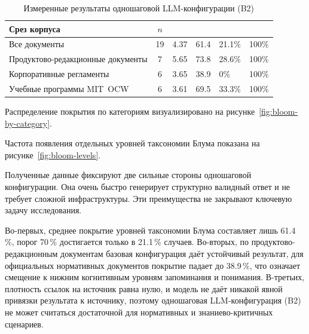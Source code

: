 \begin{table}[H]
  \caption{Измеренные результаты одношаговой LLM-конфигурации (B2)}
  \label{tab:b2prelim}
  \centering
  {\scriptsize
  \setlength{\tabcolsep}{2pt}
  \renewcommand{\arraystretch}{1.15}
  \begin{tabular}{|P{3.65cm}|c|P{1.85cm}|P{2.05cm}|P{2.35cm}|P{2.65cm}|}
  \hline
  \textbf{Срез корпуса}
    & \textbf{$n$}
    & 
    & 
    & 
    &  \\
  \hline
  Все документы
    & 19
    & 4.37
    & 61.4
    & 21.1\%
    & 100\% \\
  \hline
  Продуктово-редакционные документы
    & 7
    & 5.65
    & 73.8
    & 28.6\%
    & 100\% \\
  \hline
  Корпоративные регламенты
    & 6
    & 3.65
    & 38.9
    & 0\%
    & 100\% \\
  \hline
  Учебные программы MIT~OCW
    & 6
    & 3.61
    & 69.5
    & 33.3\%
    & 100\% \\
  \hline
  \end{tabular}
  }
\end{table}

Распределение покрытия по категориям визуализировано на рисунке~\ref{fig:bloom-by-category}.



Частота появления отдельных уровней таксономии Блума показана на рисунке~\ref{fig:bloom-levels}.



Полученные данные фиксируют две сильные стороны одношаговой
конфигурации. Она очень быстро генерирует структурно валидный
ответ и не требует сложной инфраструктуры. Эти преимущества
не закрывают ключевую задачу исследования.

Во-первых, среднее покрытие уровней таксономии Блума составляет лишь 61.4\,\%,
порог 70\,\% достигается только в 21.1\,\% случаев. Во-вторых,
по продуктово-редакционным документам базовая конфигурация даёт устойчивый результат,
для официальных нормативных документов покрытие падает
до 38.9\,\%, что означает смещение к нижним когнитивным уровням
запоминания и понимания. В-третьих, плотность ссылок на источник равна нулю,
и модель не даёт никакой явной привязки результата к источнику,
поэтому одношаговая LLM-конфигурация (B2) не может считаться достаточной для
нормативных и знаниево-критичных сценариев.

